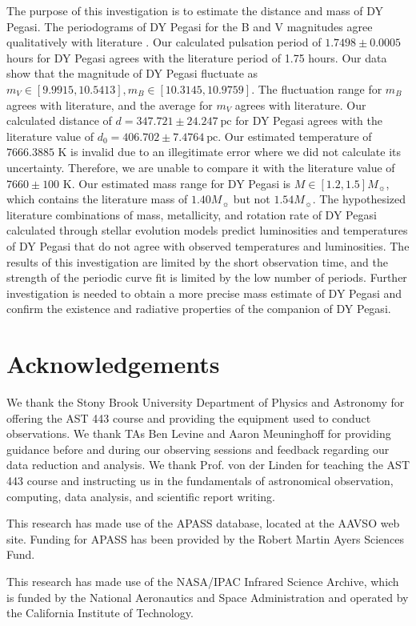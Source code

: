 \documentclass[twocolumn]{aastex631}
\begin{document}
The purpose of this investigation is to estimate the distance and mass of DY Pegasi. The periodograms of DY Pegasi for the B and V magnitudes agree qualitatively with literature \citep{Xue_2020}. Our calculated pulsation period of $1.7498 \pm 0.0005$ hours for DY Pegasi agrees with the literature period of 1.75 hours. \citep{2017_catalog} Our data show that the magnitude of DY Pegasi fluctuate as $m_V \in [9.9915, 10.5413], m_B \in [10.3145, 10.9759]$. The fluctuation range for $m_B$ agrees with literature, and the average for $m_V$ agrees with literature. Our calculated distance of $d = 347.721 \pm 24.247 \ \mathrm{pc}$ for DY Pegasi agrees with the literature value of $d_0 = 406.702 \pm 7.4764 \ \mathrm{pc}$. Our estimated temperature of $7666.3885$ K is invalid due to an illegitimate error where we did not calculate its uncertainty. Therefore, we are unable to compare it with the literature value of $7660 \pm 100$ K. Our estimated mass range for DY Pegasi is $M \in [1.2, 1.5] M_\sun$, which contains the literature mass of $1.40 M_\sun$ but not $1.54 M_\sun$. The hypothesized literature combinations of mass, metallicity, and rotation rate of DY Pegasi calculated through stellar evolution models predict luminosities and temperatures of DY Pegasi that do not agree with observed temperatures and luminosities. The results of this investigation are limited by the short observation time, and the strength of the periodic curve fit is limited by the low number of periods. Further investigation is needed to obtain a more precise mass estimate of DY Pegasi and confirm the existence and radiative properties of the companion of DY Pegasi.

\section{Acknowledgements} \label{sec:acknow}
\begin{acknowledgments}
We thank the Stony Brook University Department of Physics and Astronomy for offering the AST 443 course and providing the equipment used to conduct observations. We thank TAs Ben Levine and Aaron Meuninghoff for providing guidance before and during our observing sessions and feedback regarding our data reduction and analysis. We thank Prof. von der Linden for teaching the AST 443 course and instructing us in the fundamentals of astronomical observation, computing, data analysis, and scientific report writing.

This research has made use of the APASS database, located at the AAVSO web site. Funding for APASS has been provided by the Robert Martin Ayers Sciences Fund.

This research has made use of the NASA/IPAC Infrared Science Archive, which is funded by the National Aeronautics and Space Administration and operated by the California Institute of Technology.
\end{acknowledgments}
\end{document}
